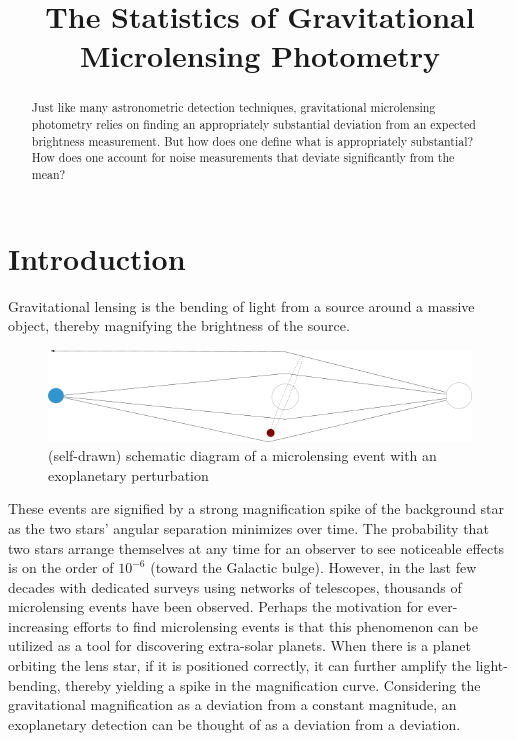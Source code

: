 \documentclass[12pt, a4paper]{article}
\author{}
\title{The Statistics of Gravitational Microlensing Photometry}
\date{}
\begin{document}
\maketitle

\begin{abstract}
Just like many astronometric detection techniques, gravitational microlensing photometry relies on finding an appropriately substantial deviation from an expected brightness measurement.
But how does one define what is appropriately substantial?
How does one account for noise measurements that deviate significantly from the mean?
\end{abstract}

\section{Introduction}

Gravitational lensing is the bending of light from a source around a massive object, thereby magnifying the brightness of the source.

\begin{figure}[H]
\centering
\includegraphics[width=12cm]{intro}
\caption{(self-drawn) schematic diagram of a microlensing event with an exoplanetary perturbation}
\label{fig:intro}
\end{figure}

These events are signified by a strong magnification spike of the background star as the two stars' angular separation minimizes over time.
The probability that two stars arrange themselves at any time for an observer to see noticeable effects is on the order of $10^{-6}$ (toward the Galactic bulge)\cite{gaudi}. 
However, in the last few decades with dedicated surveys using networks of telescopes, thousands of microlensing events have been observed.
Perhaps the motivation for ever-increasing efforts to find microlensing events is that
this phenomenon can be utilized as a tool for discovering extra-solar planets.
When there is a planet orbiting the lens star, if it is positioned correctly, it can further amplify the light-bending,
thereby yielding a spike in the magnification curve.
Considering the gravitational magnification as a deviation from a constant magnitude,
an exoplanetary detection can be thought of as a deviation from a deviation.
\end{document}
